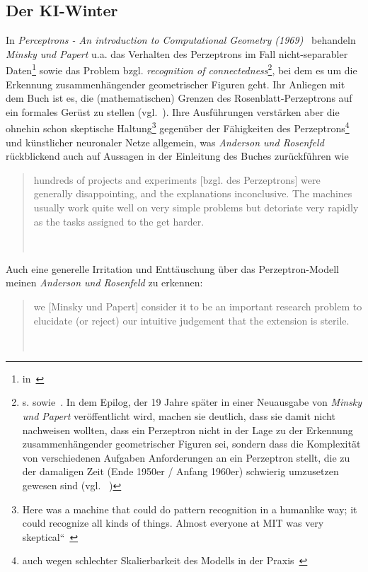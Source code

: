 \subsection{Der KI-Winter}\label{kiwinter}

In \textit{Perceptrons - An introduction to Computational Geometry (1969)}~\cite{MP88} behandeln \textit{Minsky und Papert} u.a. das Verhalten des Perzeptrons im Fall nicht-separabler Daten\footnote{
    in~\cite[181 ff.]{MP88}
} sowie das Problem bzgl. \textit{recognition of connectedness}\footnote{
    s. \cite[12, ``Theorem 0.8``]{MP88} sowie~\cite[249 f.]{MP88}. In dem Epilog, der 19 Jahre später in einer Neuausgabe von \textit{Minsky und Papert} veröffentlicht wird, machen sie deutlich, dass sie damit nicht nachweisen wollten, dass ein Perzeptron nicht in der Lage zu der Erkennung zusammenhängender geometrischer Figuren sei, sondern dass die Komplexität von verschiedenen Aufgaben Anforderungen an ein Perzeptron stellt, die zu der damaligen Zeit (Ende 1950er / Anfang 1960er) schwierig umzusetzen gewesen sind (vgl. ~\cite[250]{MP88})
}, bei dem es um die Erkennung zusammenhängender geometrischer Figuren geht.
Ihr Anliegen mit dem Buch ist es, die (mathematischen) Grenzen des Rosenblatt-Perzeptrons auf ein formales Gerüst zu stellen (vgl.~\cite[249]{MP88}).
Ihre Ausführungen verstärken aber die ohnehin schon skeptische Haltung\footnote{
    Here was a machine that could do pattern recognition in a humanlike way; it could recognize all kinds of things. Almost everyone at MIT was very skeptical``~\cite[99]{AR98}
} gegenüber der Fähigkeiten des Perzeptrons\footnote{
    auch wegen schlechter Skalierbarkeit des Modells in der Praxis~\cite[159]{AR88}
} und künstlicher neuronaler Netze allgemein, was \textit{Anderson und Rosenfeld} rückblickend auch auf Aussagen in der Einleitung des Buches zurückführen wie

\blockquote[{~\cite[19]{MP88}}]{
    hundreds of projects and experiments [bzgl. des Perzeptrons] were generally disappointing, and the explanations inconclusive. The machines usually work quite well on very simple problems but detoriate very rapidly as the tasks assigned to the get harder.
}

\noindent
Auch eine generelle Irritation und Enttäuschung über das Perzeptron-Modell meinen \textit{Anderson und Rosenfeld} zu erkennen:

\blockquote[{~\cite[232]{MP88}}]{
    we [Minsky und Papert] consider it to be an important research problem to elucidate (or reject) our intuitive judgement that the extension is sterile.
}


